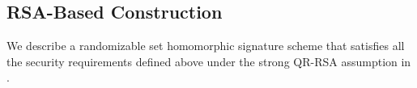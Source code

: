 


\subsection{RSA-Based Construction}

We describe a randomizable set homomorphic signature scheme 
that satisfies all the security requirements defined above
under the strong QR-RSA assumption in . 


